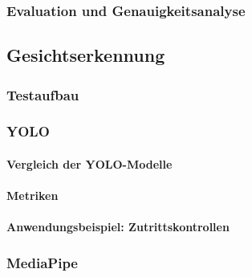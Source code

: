 \subsubsection{Evaluation und Genauigkeitsanalyse}

\subsection{Gesichtserkennung}
\subsubsection{Testaufbau}
\subsubsection{YOLO}
\paragraph{Vergleich der YOLO-Modelle}
\paragraph{Metriken}
\paragraph{Anwendungsbeispiel: Zutrittskontrollen}

\subsubsection{MediaPipe}
